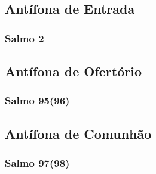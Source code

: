 \subsection{Antífona de Entrada}


\subsubsection{Salmo 2}


\subsection{Antífona de Ofertório}


\subsubsection{Salmo 95(96)}


\subsection{Antífona de Comunhão}


\subsubsection{Salmo 97(98)}
